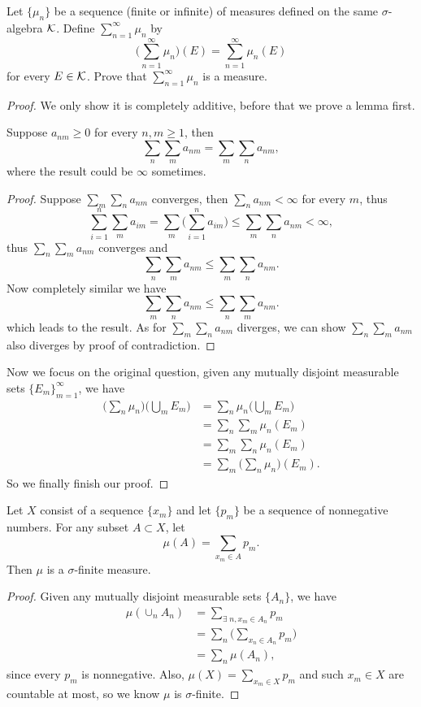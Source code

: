 \begin{pro}%
	Let $\{\mu_n\}$ be a sequence (finite or infinite) of measures defined on the same $\sigma$-algebra $\mathcal{K}$. Define $\sum_{n=1}^\infty \mu_n$ by \[\bigg(\sum_{n=1}^\infty \mu_n\bigg) (E)=\sum_{n=1}^\infty \mu_n(E)\] for every $E\in\mathcal{K}$. Prove that $\sum_{n=1}^\infty \mu_n$ is a measure.
\end{pro}
\begin{proof}
	We only show it is completely additive, before that we prove a lemma first.
	\begin{lem}
		Suppose $a_{nm}\geq 0$ for every $n,m\geq 1$, then 
		\[\sum_n\sum_m a_{nm}=\sum_m \sum_n a_{nm},\]
		where the result could be $\infty$ sometimes.
	\end{lem}
	\begin{proof}
		Suppose $\sum_{m}\sum_n a_{nm}$ converges, then $\sum_n a_{nm}<\infty$ for every $m$, thus
		\[\sum_{i=1}^n\sum_{m} a_{im}=\sum_m\bigg(\sum_{i=1}^n a_{im}\bigg)\leq \sum_m\sum_n a_{nm}<\infty,\]
		thus $\sum_{n}\sum_{m} a_{nm}$ converges and
		\[\sum_{n}\sum_{m} a_{nm}\leq \sum_{m}\sum_{n} a_{nm}.\]
		Now completely similar we have
		\[\sum_{m}\sum_{n} a_{nm}\leq \sum_{n}\sum_{m} a_{nm}.\]
		which leads to the result. As for $\sum_{m}\sum_{n} a_{nm}$ diverges, we can show $\sum_{n}\sum_{m} a_{nm}$ also diverges by proof of contradiction.
	\end{proof}
	Now we focus on the original question, given any mutually disjoint measurable sets $\{E_m\}_{m=1}^\infty$, we have
	\begin{align*}
		\bigg(\sum_n \mu_n \bigg)\bigg(\bigcup_m E_m\bigg)&=\sum_n \mu_n\bigg(\bigcup_m E_m\bigg)\\
											 &=\sum_n \sum_m \mu_n(E_m)\\
											 &=\sum_m \sum_n \mu_n(E_m)\\
											 &=\sum_m \bigg(\sum_n \mu_n \bigg)(E_m).
	\end{align*}
	So we finally finish our proof. 
\end{proof}

\begin{pro}%
	Let $X$ consist of a sequence $\{x_m\}$ and let $\{p_m\}$ be a sequence of nonnegative numbers. For any subset $A\subset X$, let
	\[\mu(A)=\sum_{x_m\in A} p_m.\]
	Then $\mu$ is a $\sigma$-finite measure.
\end{pro}
\begin{proof}
	Given any mutually disjoint measurable sets $\{A_n\}$, we have
	\begin{align*}
		\mu(\cup_n A_n)&= \sum_{\exists\; n,x_m\in A_n} p_m\\
					   &= \sum_n\bigg(\sum_{x_n\in A_n} p_m\bigg)\\
					   &= \sum_n \mu(A_n),
	\end{align*}
	since every $p_m$ is nonnegative. Also, $\mu(X)=\sum_{x_m\in X} p_m$ and such $x_m\in X$ are countable at most, so we know $\mu$ is $\sigma$-finite.
\end{proof}

